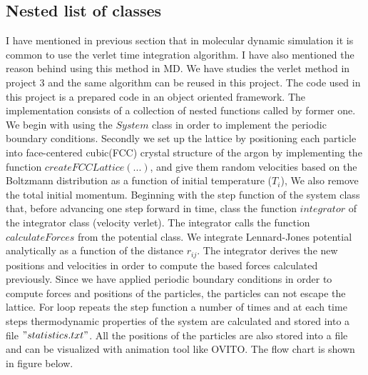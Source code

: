 \documentclass[a4paper]{article}
\begin{document}
\subsection{Nested list of classes}
I have mentioned in previous section that in molecular dynamic simulation it is common to use the verlet time integration algorithm. I have also mentioned the reason behind using this method in MD. We have studies the verlet method in project 3 and the same algorithm can be reused in this project.  
The code used in this project is a prepared code in an object oriented framework. The implementation consists of a collection of nested functions called by former one. We begin with using the $System$ class in order to implement the periodic boundary conditions. Secondly we set up the lattice by positioning each particle into face-centered cubic(FCC) crystal structure of the argon by implementing the function $createFCCLattice(...)$, and give them random velocities based on the Boltzmann distribution as a function of initial temperature ($T_i$), We also remove the total initial momentum. Beginning with the step function of the system class that, before advancing one step forward in time, class the function $integrator$ of the integrator class (velocity verlet). The integrator calls the function $calculateForces$ from the potential class. We integrate Lennard-Jones potential analytically as a function of the distance $r_{ij}$. The integrator derives the new positions and velocities in order to compute the based forces calculated previously. Since we have applied periodic boundary conditions in order to compute forces and positions of the particles, the particles can not escape the lattice. For loop repeats the step function a number of times and at each time steps thermodynamic properties of the system are calculated and stored into a file $"statistics.txt"$.  All the positions of the particles are also stored into a file and can be visualized with animation tool like OVITO. The flow chart is shown in figure below. 
\end{document}
